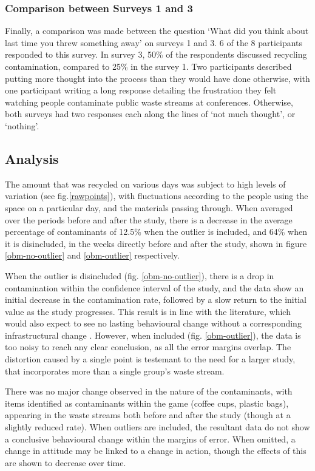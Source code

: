 \documentclass[nofonts,nols,justified,nobib]{tufte-book}
\begin{document}
\subsubsection*{Comparison between Surveys 1 and 3}
Finally, a comparison was made between the question `What did you think about last time you threw something away' on surveys 1 and 3. 6 of the 8 participants responded to this survey. In survey 3, 50\% of the respondents discussed recycling contamination, compared to 25\% in the survey 1. Two participants described putting more thought into the process than they would have done otherwise, with one participant writing a long response detailing the frustration they felt watching people contaminate public waste streams at conferences. Otherwise, both surveys had two responses each along the lines of `not much thought', or `nothing'.

\subsection*{Analysis}
The amount that was recycled on various days was subject to high levels of variation (see fig.\ref{rawpoints}), with fluctuations according to the people using the space on a particular day, and the materials passing through. When averaged over the periods before and after the study, there is a decrease in the average percentage of contaminants of 12.5\% when the outlier is included, and 64\% when it is disincluded, in the weeks directly before and after the study, shown in figure \ref{obm-no-outlier} and \ref{obm-outlier} respectively.

When the outlier is disincluded (fig. \ref{obm-no-outlier}), there is a drop in contamination within the confidence interval of the study, and the data show an initial decrease in the contamination rate, followed by a slow return to the initial value as the study progresses. This result is in line with the literature, which would also expect to see no lasting behavioural change without a corresponding infrastructural change \cite{}. However, when included (fig. \ref{obm-outlier}), the data is too noisy to reach any clear conclusion, as all the error margins overlap. The distortion caused by a single point is testemant to the need for a larger study, that incorporates more than a single group's waste stream.

There was no major change observed in the nature of the contaminants, with items identified as contaminants within the game (coffee cups, plastic bags), appearing in the waste streams both before and after the study (though at a slightly reduced rate). When outliers are included, the resultant data do not show a conclusive behavioural change within the margins of error. When omitted, a change in attitude may be linked to a change in action, though the effects of this are shown to decrease over time.
\end{document}
